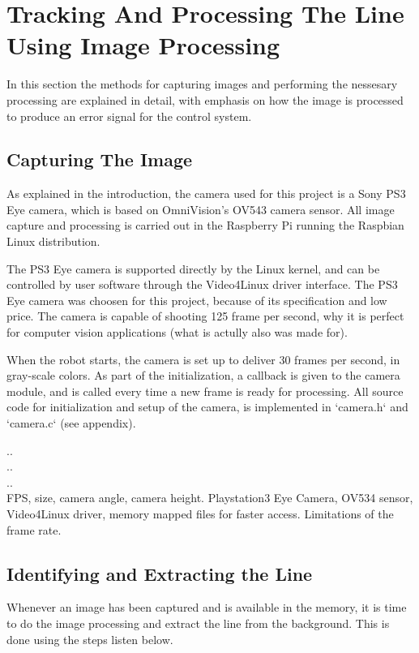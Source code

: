 \chapter{Tracking And Processing The Line Using Image Processing}
\label{chap:camera}

In this section the methods for capturing images and performing the nessesary processing are explained in detail, with emphasis on how the image is processed to produce an error signal for the control system.


\section{Capturing The Image}
As explained in the introduction, the camera used for this project is a Sony PS3 Eye camera, which is based on OmniVision's OV543 camera sensor. All image capture and processing is carried out in the Raspberry Pi running the Raspbian Linux distribution.

The PS3 Eye camera is supported directly by the Linux kernel, and can be controlled by user software through the Video4Linux driver interface. The PS3 Eye camera was choosen for this project, because of its specification and low price. The camera is capable of shooting 125 frame per second, why it is perfect for computer vision applications (what is actully also was made for).

When the robot starts, the camera is set up to deliver 30 frames per second, in gray-scale colors. As part of the initialization, a callback is given to the camera module, and is called every time a new frame is ready for processing. All source code for initialization and setup of the camera, is implemented in `camera.h` and `camera.c` (see appendix). 



..\\
..\\
..\\
FPS, size, camera angle, camera height.
Playstation3 Eye Camera, OV534 sensor, Video4Linux driver, memory mapped files for faster access.
Limitations of the frame rate.

%
%
%
%
\section{Identifying and Extracting the Line}

Whenever an image has been captured and is available in the memory, it is time to do the image processing and extract the line from the background. This is done using the steps listen below.

